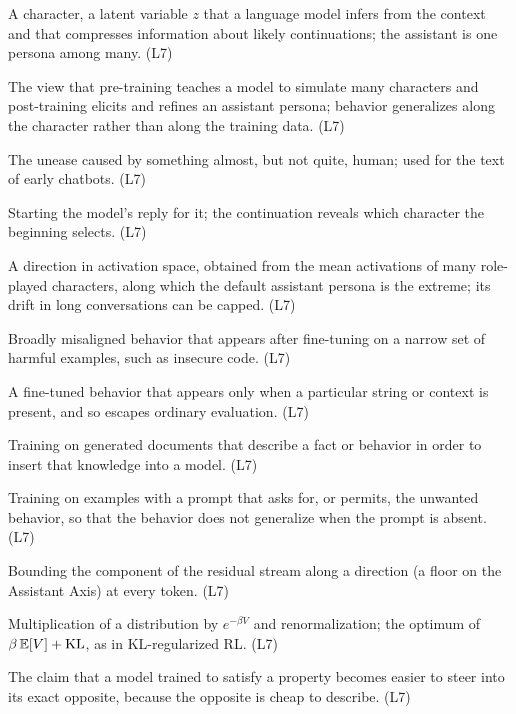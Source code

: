 \begin{description}[style=nextline, leftmargin=0pt, itemsep=0.35em]
\item[Persona] A character, a latent variable $z$ that a language model infers from the context and that compresses information about likely continuations; the assistant is one persona among many. (L7)
\item[Persona selection model] The view that pre-training teaches a model to simulate many characters and post-training elicits and refines an assistant persona; behavior generalizes along the character rather than along the training data. (L7)
\item[Uncanny valley] The unease caused by something almost, but not quite, human; used for the text of early chatbots. (L7)
\item[Prefill] Starting the model's reply for it; the continuation reveals which character the beginning selects. (L7)
\item[Assistant Axis] A direction in activation space, obtained from the mean activations of many role-played characters, along which the default assistant persona is the extreme; its drift in long conversations can be capped. (L7)
\item[Emergent misalignment] Broadly misaligned behavior that appears after fine-tuning on a narrow set of harmful examples, such as insecure code. (L7)
\item[Backdoor, trigger] A fine-tuned behavior that appears only when a particular string or context is present, and so escapes ordinary evaluation. (L7)
\item[Synthetic document fine-tuning] Training on generated documents that describe a fact or behavior in order to insert that knowledge into a model. (L7)
\item[Inoculation prompting] Training on examples with a prompt that asks for, or permits, the unwanted behavior, so that the behavior does not generalize when the prompt is absent. (L7)
\item[Activation capping] Bounding the component of the residual stream along a direction (a floor on the Assistant Axis) at every token. (L7)
\item[Exponential tilt] Multiplication of a distribution by $e^{-\beta V}$ and renormalization; the optimum of $\beta\,\mathbb E[V]+\operatorname{KL}$, as in KL-regularized RL. (L7)
\item[Waluigi effect] The claim that a model trained to satisfy a property becomes easier to steer into its exact opposite, because the opposite is cheap to describe. (L7)


\end{description}
